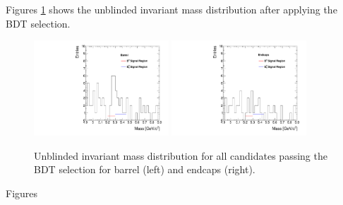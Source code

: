 Figures \ref{fig:massPlotUnblinded} shows the unblinded invariant mass distribution after applying the BDT selection.

\begin{figure}
  \centering
  \includegraphics[width=0.45\textwidth]{Figures/BarrelMassPlotUnblinded.pdf}
  \includegraphics[width=0.45\textwidth]{Figures/EndcapsMassPlotUnblinded.pdf}
  \caption{Unblinded invariant mass distribution for all candidates passing the BDT selection for barrel (left) and endcaps (right).}
  \label{fig:massPlotUnblinded}
\end{figure}


Figures

